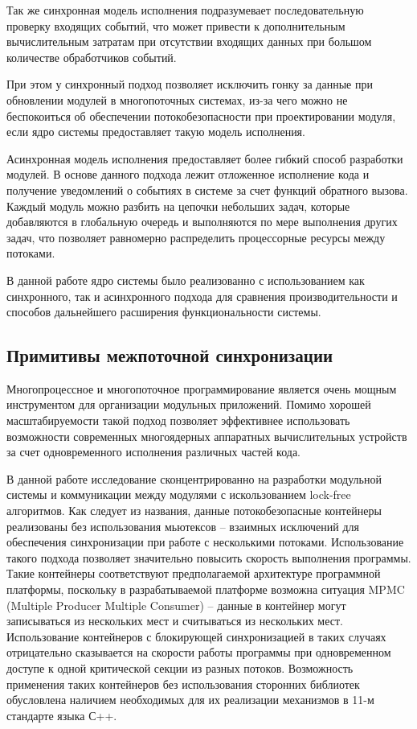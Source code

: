 Так же синхронная модель исполнения подразумевает последовательную проверку входящих событий, что может привести к дополнительным вычислительным затратам при отсутствии входящих данных при большом количестве обработчиков событий.

При этом у синхронный подход позволяет исключить гонку за данные при обновлении модулей в многопоточных системах, из-за чего можно не беспокоиться об обеспечении потокобезопасности при проектировании модуля, если ядро системы предоставляет такую модель исполнения.

Асинхронная модель исполнения предоставляет более гибкий способ разработки модулей. В основе данного подхода лежит отложенное исполнение кода и получение уведомлений о событиях в системе за счет функций обратного вызова. Каждый модуль можно разбить на цепочки небольших задач, которые добавляются в глобальную очередь и выполняются по мере выполнения других задач, что позволяет равномерно распределить процессорные ресурсы между потоками.

В данной работе ядро системы было реализованно с использованием как синхронного, так и асинхронного подхода для сравнения производительности и способов дальнейшего расширения функциональности системы.

\subsection{Примитивы межпоточной синхронизации}

Многопроцессное и многопоточное программирование является очень мощным инструментом для организации модульных приложений. Помимо хорошей масштабируемости такой подход позволяет эффективнее использовать возможности современных многоядерных аппаратных вычислительных устройств за счет одновременного исполнения различных частей кода.

В данной работе исследование сконцентрированно на разработки модульной системы и коммуникации между модулями с искользованием lock-free алгоритмов. Как следует из названия, данные потокобезопасные контейнеры реализованы без использования мьютексов – взаимных исключений для обеспечения синхронизации при работе с несколькими потоками. Использование такого подхода позволяет значительно повысить скорость выполнения программы. Такие контейнеры соответствуют предполагаемой архитектуре программной платформы, поскольку в разрабатываемой платформе возможна ситуация MPMC (Multiple Producer Multiple Consumer) – данные в контейнер могут записываться из нескольких мест и считываться из нескольких мест. Использование контейнеров с блокирующей синхронизацией в таких случаях отрицательно сказывается на скорости работы программы при одновременном доступе к одной критической секции из разных потоков. Возможность применения таких контейнеров без использования сторонних библиотек обусловлена наличием необходимых для их реализации механизмов в 11-м стандарте языка С++.

